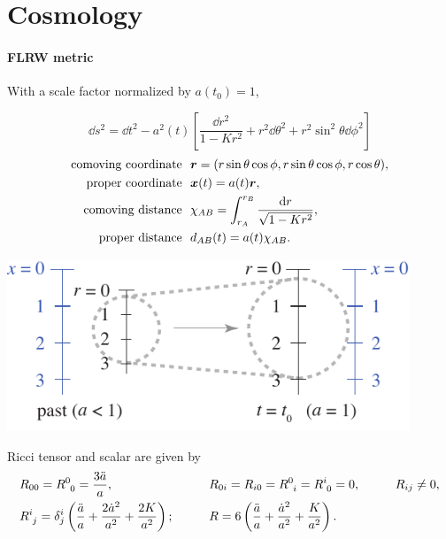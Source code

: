 \documentclass[CheatSheet]{subfiles}
\begin{document}
\summarystyle
\section{Cosmology}
\paragraph{FLRW metric} With a scale factor normalized by $a(t_0)=1$,\\
\begin{minipage}{0.6\textwidth}
\begin{equation}
  \dd s^2 = \dd t^2-a^2(t)\left[
  \frac{\dd r^2}{1-K r^2}+r^2\dd\theta^2+r^2\sin^2\theta\dd\phi^2
\right]
\end{equation}\vspace{-2em}
\begin{align*}
\text{comoving coordinate~~}& {\boldsymbol{r}}=(r\sin\theta\cos\phi,r\sin\theta\cos\phi,r\cos\theta),\\
\text{proper coordinate~~}& {\boldsymbol{x}}(t)=a(t){\boldsymbol{r}},\\
\text{comoving distance~~}& \chi_{AB}=\int_{r_A}^{r_B}\frac{\mathop{}\!\mathrm{d} r}{\sqrt{1-Kr^2}},\\
\text{proper distance~~}& d_{AB}(t)=a(t)\chi_{AB}.
\end{align*}
\end{minipage}
\begin{minipage}{0.395\textwidth}
\hfill\includegraphics[width=0.9\textwidth]{figs/expansion.pdf}
\end{minipage}

\vspace{0.5em}

Ricci tensor and scalar are given by
\begin{alignat}{3}
 &R_{00}=\tensor{R}{^0_0}=\frac{3\ddot a}{a}, \qquad&
 &R_{0i}=R_{i0}=\tensor{R}{^0_i} = \tensor{R}{^i_0}=0, \qquad&
 &R_{ij}\neq 0,\notag
\\
 &\tensor{R}{^i_j} = \delta^i_j\left(\frac{\ddot a}{a} + \frac{2\dot a^2}{a^2} + \frac{2K}{a^2}\right);\qquad&
 &R = 6\left(\frac{\ddot a}{a} + \frac{\dot a^2}{a^2} + \frac{K}{a^2}\right).
\end{alignat}
\end{document}
